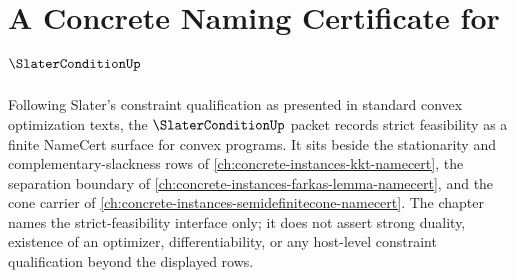 \chapter{A Concrete Naming Certificate for $\SlaterConditionUp$}
\label{ch:concrete-instances-slater-condition-namecert}

Following Slater's constraint qualification as presented in standard convex optimization texts, the $\SlaterConditionUp$ packet records strict feasibility as a finite NameCert surface for convex programs. It sits beside the stationarity and complementary-slackness rows of \autoref{ch:concrete-instances-kkt-namecert}, the separation boundary of \autoref{ch:concrete-instances-farkas-lemma-namecert}, and the cone carrier of \autoref{ch:concrete-instances-semidefinitecone-namecert}. The chapter names the strict-feasibility interface only; it does not assert strong duality, existence of an optimizer, differentiability, or any host-level constraint qualification beyond the displayed rows.


